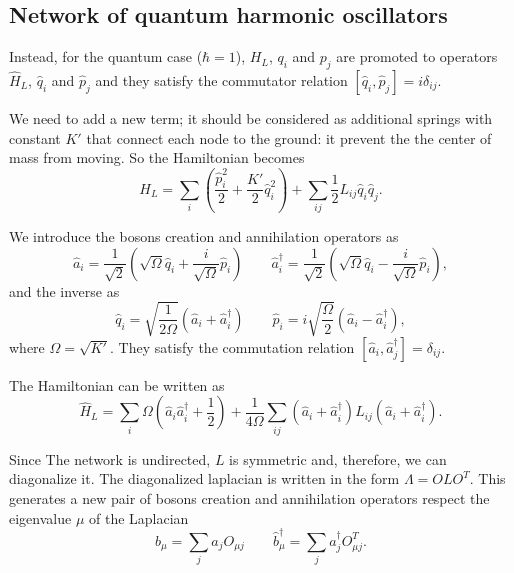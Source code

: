 \subsection{Network of quantum harmonic oscillators}

Instead, for the quantum case ($\hbar = 1$), $H_L$, $q_i$ and $p_j$ are promoted to operators $\hat H_L$, $\hat q_i$ and $\hat p_j$ and  they satisfy the commutator relation $\left[\hat q_i, \hat p_j\right] = i \delta_{ij}$.

We need to add a new term; it should be considered as additional springs with constant $K'$ that connect each node to the ground: it prevent the the center of mass from moving. So the Hamiltonian becomes
\begin{equation}\label{H_L_QM}
    H_L = \sum_i\left(\frac{\hat p_i^2}{2}+\frac{K'}{2}\hat q_i^2\right) + \sum_{ij}\frac{1}{2} L_{ij}\hat q_i\hat q_j.
\end{equation}

We introduce the bosons creation and annihilation operators as
\begin{equation}
     \hat a_i = \frac{1}{\sqrt{2}}\left(\sqrt{\Omega} \hat q_i + \frac{i}{\sqrt{\Omega}}\hat p_i\right) \qquad 
     \hat a_i^\dagger = \frac{1}{\sqrt{2}}\left(\sqrt{\Omega} \hat q_i - \frac{i}{\sqrt{\Omega}}\hat p_i\right), 
\end{equation}
and the inverse as
\begin{equation}
    \hat q_i = \sqrt{\frac{1}{2\Omega}}\left(\hat a_i + \hat a_i^\dagger\right) \qquad
    \hat p_i = i\sqrt{\frac{\Omega}{2}}\left(\hat a_i - \hat a_i^\dagger\right),
\end{equation}
where $\Omega = \sqrt{K'}$.
They satisfy the commutation relation $\left[\hat a_i, \hat a^\dagger_j\right] = \delta_{ij}$. 

The Hamiltonian can be written as 
\begin{equation}
    \hat H_L = \sum_i \Omega \left(\hat a_i\hat a^\dagger_i + \frac{1}{2}\right) + \frac{1}{4\Omega}\sum_{ij}\left(\hat a_i +\hat a_i^\dagger\right)L_{ij}\left(\hat a_i +\hat a_i^\dagger\right).
\end{equation}

Since The network is undirected, $L$ is symmetric and, therefore, we can diagonalize it. The diagonalized laplacian is written in the form $\Lambda = OLO^T$.
This generates a new pair of bosons creation and annihilation operators respect the eigenvalue $\mu$ of the Laplacian
\begin{equation}
    b_\mu = \sum_j a_jO_{\mu j}  \qquad \hat b_\mu^\dagger = \sum_j a_j^\dagger O^T_{\mu j} .
\end{equation}

